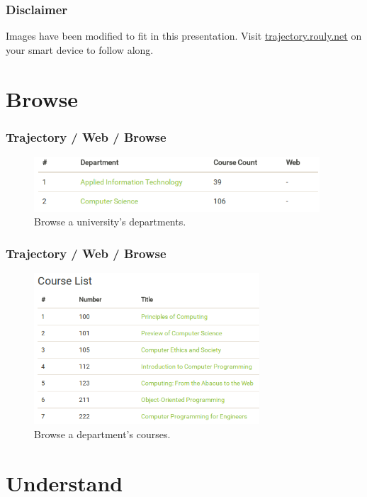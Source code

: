 \documentclass[10pt, compress]{beamer}
\begin{document}


\begin{frame}
  \frametitle{Disclaimer}
  Images have been modified to fit in this presentation.
  \vfill
  Visit \url{trajectory.rouly.net} on your smart device to follow along.
\end{frame}

\section{Browse}

\begin{frame}
  \frametitle{Trajectory / Web / Browse}
  \begin{figure}
    \centering
    \includegraphics[width=0.95\textwidth]{figs/shots/departments.png}
    \caption{Browse a university's departments.}
  \end{figure}
\end{frame}

\begin{frame}
  \frametitle{Trajectory / Web / Browse}
  \begin{figure}
    \centering
    \includegraphics[width=0.75\textwidth]{figs/shots/courses.png}
    \caption{Browse a department's courses.}
  \end{figure}
\end{frame}

\section{Understand}
\end{document}
